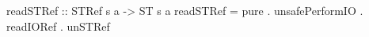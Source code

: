 \begin{code}
readSTRef :: STRef s a -> ST s a
readSTRef =
  pure . unsafePerformIO . readIORef . unSTRef
\end{code}
